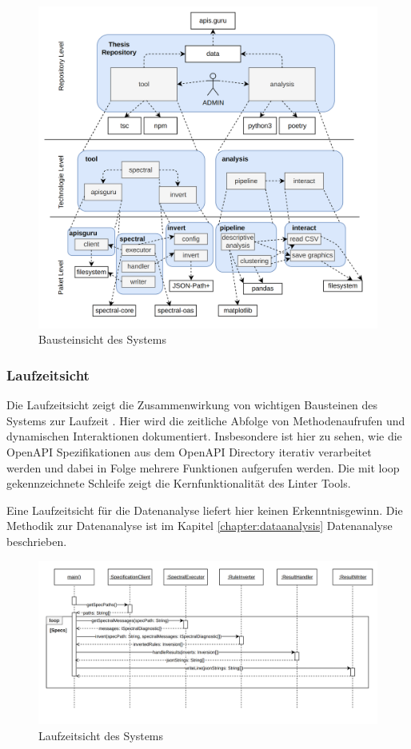\begin{figure}[htbp]
  \centering
  \includegraphics[width=1\linewidth]{img/buildingblockview.png}
  \caption{Bausteinsicht des Systems}
  \label{fig:Bausteinsicht}
\end{figure}


\subsubsection{Laufzeitsicht} \label{sec:laufzeitsicht}
Die Laufzeitsicht zeigt die Zusammenwirkung von wichtigen Bausteinen des Systems zur Laufzeit \parencite{starke_effektive_2024}. Hier wird die zeitliche Abfolge von Methodenaufrufen und dynamischen Interaktionen dokumentiert. Insbesondere ist hier zu sehen, wie die OpenAPI Spezifikationen aus dem OpenAPI Directory iterativ verarbeitet werden und dabei in Folge mehrere Funktionen aufgerufen werden.  Die mit loop gekennzeichnete Schleife zeigt die Kernfunktionalität des Linter Tools.

Eine Laufzeitsicht für die Datenanalyse liefert hier keinen Erkenntnisgewinn. Die Methodik zur Datenanalyse ist im Kapitel \ref{chapter:dataanalysis} Datenanalyse beschrieben.

\begin{figure}[htbp]
  \centering
  \includegraphics[width=1\linewidth]{img/runtimeview.png}
  \caption{Laufzeitsicht des Systems}
  \label{fig:Laufzeitsicht}
\end{figure}


